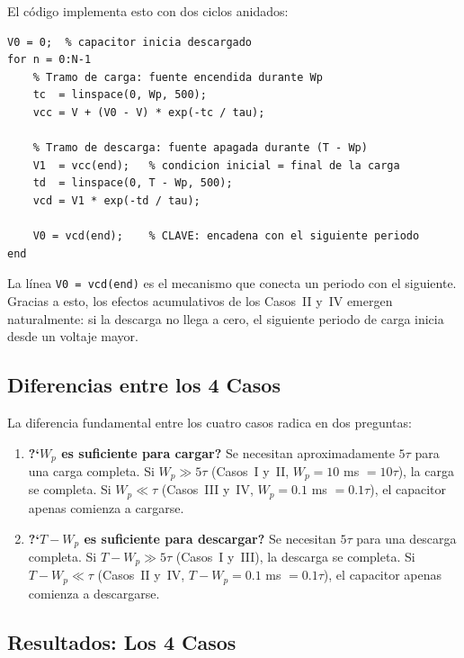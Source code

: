 \documentclass[12pt,a4paper]{article}
\begin{document}
El c\'odigo implementa esto con dos ciclos anidados:

\begin{lstlisting}[style=matlab, caption={Construcci\'on de la respuesta por tramos. La l\'inea 13 es la clave: el voltaje final de la descarga se convierte en la condici\'on inicial del siguiente periodo.}]
V0 = 0;  % capacitor inicia descargado
for n = 0:N-1
    % Tramo de carga: fuente encendida durante Wp
    tc  = linspace(0, Wp, 500);
    vcc = V + (V0 - V) * exp(-tc / tau);

    % Tramo de descarga: fuente apagada durante (T - Wp)
    V1  = vcc(end);   % condicion inicial = final de la carga
    td  = linspace(0, T - Wp, 500);
    vcd = V1 * exp(-td / tau);

    V0 = vcd(end);    % CLAVE: encadena con el siguiente periodo
end
\end{lstlisting}

La l\'inea \texttt{V0 = vcd(end)} es el mecanismo que conecta un periodo con el siguiente. Gracias a esto, los efectos acumulativos de los Casos~II y~IV emergen naturalmente: si la descarga no llega a cero, el siguiente periodo de carga inicia desde un voltaje mayor.

\subsection{Diferencias entre los 4 Casos}

La diferencia fundamental entre los cuatro casos radica en dos preguntas:

\begin{enumerate}
    \item \textbf{?`$W_p$ es suficiente para cargar?} Se necesitan aproximadamente $5\tau$ para una carga completa. Si $W_p \gg 5\tau$ (Casos~I y~II, $W_p = 10$ ms $= 10\tau$), la carga se completa. Si $W_p \ll \tau$ (Casos~III y~IV, $W_p = 0.1$ ms $= 0.1\tau$), el capacitor apenas comienza a cargarse.

    \item \textbf{?`$T - W_p$ es suficiente para descargar?} Se necesitan $5\tau$ para una descarga completa. Si $T - W_p \gg 5\tau$ (Casos~I y~III), la descarga se completa. Si $T - W_p \ll \tau$ (Casos~II y~IV, $T - W_p = 0.1$ ms $= 0.1\tau$), el capacitor apenas comienza a descargarse.
\end{enumerate}

\subsection{Resultados: Los 4 Casos}
\end{document}
